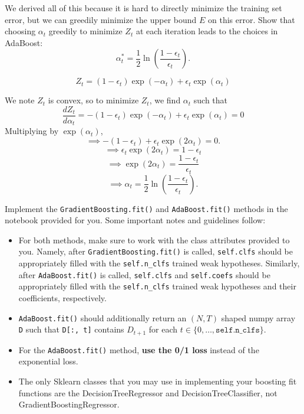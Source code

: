 \problem[2]
We derived all of this because it is hard to directly minimize the training set error, but we can greedily minimize the upper bound $E$ on this error. Show that choosing $\alpha_t$
greedily to minimize $Z_t$ at each iteration leads to the choices in
AdaBoost:
$$\alpha_{t}^* = \frac{1}{2} \ln \left(\frac{1 - \epsilon_t}{\epsilon_t} \right).$$

\begin{solution}
	\[Z_t = (1-\epsilon_t)\exp(-\alpha_t) + \epsilon_t \exp(\alpha_t)\]
	
	We note $Z_t$ is convex, so to minimize $Z_t$, we find $\alpha_t$ such that  
	\[
	\frac{dZ_t}{d \alpha_t} = -(1-\epsilon_t)\exp(-\alpha_t) + \epsilon_t \exp(\alpha_t) = 0
	\]
	Multiplying by $\exp(\alpha_t)$,
	\[
	\implies -(1-\epsilon_t) + \epsilon_t \exp(2\alpha_t) = 0.
	\]
	\[
	\implies  \epsilon_t \exp(2\alpha_t) = 1-\epsilon_t
	\]
	\[
	\implies  \exp(2\alpha_t) = \frac{1-\epsilon_t}{\epsilon_t }
	\]
	\[
	\implies  \boxed{\alpha_t = \frac{1}{2} \ln \left( \frac{1-\epsilon_t}{\epsilon_t } \right)}.
	\]
	
\end{solution}

\begin{problem}[14]
    Implement the \texttt{GradientBoosting.fit()} and \texttt{AdaBoost.fit()} methods in the notebook provided for you. Some important notes and guidelines follow:
    \begin{itemize}
        \item For both methods, make sure to work with the class attributes provided to you. Namely, after \texttt{GradientBoosting.fit()} is called, \texttt{self.clfs} should be appropriately filled with the \texttt{self.n_clfs} trained weak hypotheses. Similarly, after \texttt{AdaBoost.fit()} is called, \texttt{self.clfs} and \texttt{self.coefs} should be appropriately filled with the \texttt{self.n_clfs} trained weak hypotheses and their coefficients, respectively.
        \item \texttt{AdaBoost.fit()} should additionally return an $(N, T)$ shaped numpy array \texttt{D} such that \texttt{D[:, t]} contains $D_{t+1}$ for each $t \in \{0, \ldots, \texttt{self.n_clfs}\}$.
        \item For the \texttt{AdaBoost.fit()} method, \textbf{use the 0/1 loss} instead of the exponential loss.
	\item The only Sklearn classes that you may use in implementing your boosting fit functions are the DecisionTreeRegressor and DecisionTreeClassifier, not GradientBoostingRegressor.
    \end{itemize}
\end{problem}

